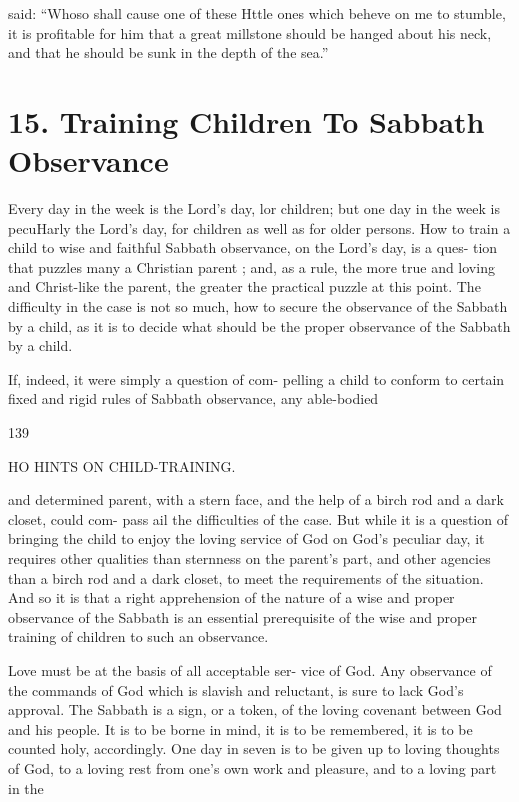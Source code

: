 \documentclass[
]{book}
\begin{document}
said: ``Whoso shall cause one of these Httle ones which beheve on me to stumble, it is profitable for him that a great millstone should be hanged about his neck, and that he should be sunk in the depth of the sea.''

\hypertarget{training-children-to-sabbath-observance}{%
\chapter{15. Training Children To Sabbath Observance}\label{training-children-to-sabbath-observance}}

Every day in the week is the Lord's day, lor children; but one day in the week is pecuHarly the Lord's day, for children as well as for older persons. How to train a child to wise and faithful Sabbath observance, on the Lord's day, is a ques- tion that puzzles many a Christian parent ; and, as a rule, the more true and loving and Christ-like the parent, the greater the practical puzzle at this point. The difficulty in the case is not so much, how to secure the observance of the Sabbath by a child, as it is to decide what should be the proper observance of the Sabbath by a child.

If, indeed, it were simply a question of com- pelling a child to conform to certain fixed and rigid rules of Sabbath observance, any able-bodied

139

HO HINTS ON CHILD-TRAINING.

and determined parent, with a stern face, and the help of a birch rod and a dark closet, could com- pass ail the difficulties of the case. But while it is a question of bringing the child to enjoy the loving service of God on God's peculiar day, it requires other qualities than sternness on the parent's part, and other agencies than a birch rod and a dark closet, to meet the requirements of the situation. And so it is that a right apprehension of the nature of a wise and proper observance of the Sabbath is an essential prerequisite of the wise and proper training of children to such an observance.

Love must be at the basis of all acceptable ser- vice of God. Any observance of the commands of God which is slavish and reluctant, is sure to lack God's approval. The Sabbath is a sign, or a token, of the loving covenant between God and his people. It is to be borne in mind, it is to be remembered, it is to be counted holy, accordingly. One day in seven is to be given up to loving thoughts of God, to a loving rest from one's own work and pleasure, and to a loving part in the
\end{document}
